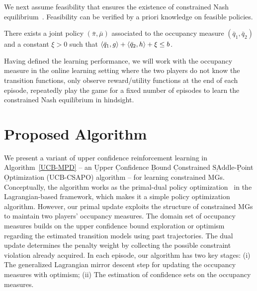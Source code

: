 \documentclass[12pt, final]{l4dc2023}
\begin{document}
We next assume feasibility that ensures the existence of constrained Nash equilibrium~\citep{altman2000constrained}. Feasibility can be verified by a priori knowledge on feasible policies.

\begin{assumption}[Feasibility]\label{as.feasibility}
	There exists a joint policy $(\bar \pi,\bar\mu)$ associated to the occupancy measure $(\bar q_1,\bar q_2)$ and a constant $\xi>0$ such that $\left\langle \bar q_1,g \right\rangle+\left\langle \bar q_2,h \right\rangle+\xi\leq b$.
\end{assumption}

Having defined the learning performance, we will work with the occupancy measure in the online learning setting where the two players do not know the transition functions, only observe reward/utility functions at the end of each episode, repeatedly play the game for a fixed number of episodes to learn the constrained Nash equilibrium in hindsight.

\vspace*{-1ex}
\section{Proposed Algorithm}
\label{algorithm}

We present a variant of upper confidence reinforcement learning in Algorithm~\ref{UCB-MPD} -- an $\underline{\text{U}}$pper $\underline{\text{C}}$onfidence $\underline{\text{B}}$ound $\underline{\text{C}}$onstrained $\underline{\text{SA}}$ddle-$\underline{\text{P}}$oint $\underline{\text{O}}$ptimization (UCB-CSAPO) algorithm -- for learning constrained MGs. Conceptually, the algorithm works as the primal-dual policy optimization~\citep{efroni2020exploration,ding2020provably,chen2021primal} in the Lagrangian-based framework, which makes it a simple policy optimization algorithm. However, our primal update exploits the structure of constrained MGs to maintain two players' occupancy measures. The domain set of occupancy measures builds on the upper confidence bound exploration or optimism~\citep{jaksch2010near} regarding the estimated transition models using past trajectories. The dual update determines the penalty weight by collecting the possible constraint violation already acquired. In each episode, our algorithm has two key stages: (i) The generalized Lagrangian mirror descent step for updating the occupancy measures with optimism; (ii) The estimation of confidence sets on the occupancy measures.
\end{document}
